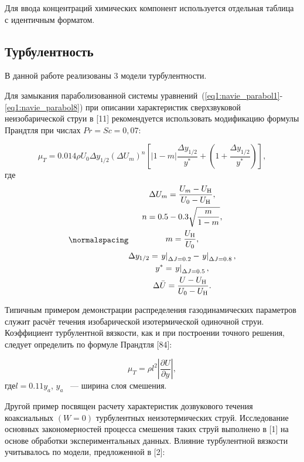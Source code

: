 Для ввода концентраций химических компонент используется отдельная таблица с идентичным форматом.

\subsection{Турбулентность}

В данной работе реализованы 3 модели турбулентности.

Для замыкания параболизованной системы уравнений~(\ref{eq1:navie_parabol1}-\ref{eq1:navie_parabol8}) при описании характеристик сверхзвуковой неизобарической струи в [11] рекомендуется использовать модификацию формулы Прандтля при числах $Pr = Sc = 0,07$:

\begin{equation}
    \mu_{T}=0.014 \rho U_{0} \Delta y_{1 / 2}\left(\Delta U_{m}\right)^{n}\left[|1-m| \frac{\Delta y_{1 / 2}}{y^{*}}+\left(1+\frac{\Delta y_{1 / 2}}{y^{*}}\right)\right],
\end{equation}
где
\begin{equation}
\label{eq2:helper_funcs}
\normalspacing
\begin{gathered}
\Delta U_{m}=\frac{U_{m}-U_{\mathrm{H}}}{U_{0}-U_{\mathrm{H}}}, \\
n=0.5-0.3 \sqrt{\frac{m}{1-m}}, \\
m=\frac{U_{\mathrm{H}}}{U_{0}}, \\
\Delta y_{1 / 2}=\left.y\right|_{\Delta J=0.2}-\left.y\right|_{\Delta J=0.8}, \\
y^{*}=\left.y\right|_{\Delta J=0.5}, \\
\Delta \bar{U}=\frac{U-U_{\mathrm{H}}}{U_{0}-U_{\mathrm{H}}}.
\end{gathered}
\end{equation}

Типичным примером демонстрации распределения газодинамических параметров служит расчёт течения изобарической изотермической одиночной струи. Коэффициент турбулентной вязкости, как и при построении точного решения, следует определить по формуле Прандтля [84]:

\begin{equation}
    \mu_{T}=\rho l^2 |\frac{\partial U}{\partial y}|,
\end{equation}
где$l = 0.11y_a$, $y_a$ ~--- ширина слоя смешения.

Другой пример посвящен расчету характеристик дозвукового течения коаксиальных $(W = 0)$ турбулентных неизотермических струй. Исследование основных закономерностей процесса смешения таких струй выполнено в [1] на основе обработки экспериментальных данных.  Влияние турбулентной вязкости учитывалось по модели, предложенной в [2]:

